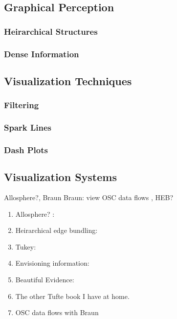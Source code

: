 	\subsection{Graphical Perception}
		\subsubsection{Heirarchical Structures}
		\subsubsection{Dense Information}
	\subsection{Visualization Techniques}
		\subsubsection{Filtering}
		\subsubsection{Spark Lines}
		\subsubsection{Dash Plots}
	\subsection{Visualization Systems}
		Allosphere?, Braun Braun: view OSC data flows , HEB?
	\begin{enumerate}
		\item Allosphere? :
		\item Heirarchical edge bundling: 
		\item Tukey: 
		\item Envisioning information: 
		\item Beautiful Evidence: 
		\item The other Tufte book I have at home.
		\item OSC data flows with Braun 
	\end{enumerate}

